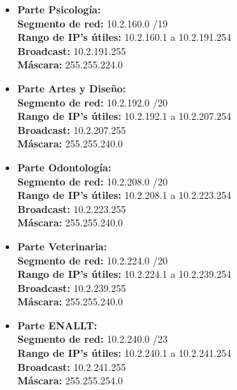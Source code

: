 \begin{itemize}[leftmargin=*]
    \item \textbf{Parte Psicología:} \\
    \textbf{Segmento de red:} 10.2.160.0 /19 \\
    \textbf{Rango de IP's útiles:} 10.2.160.1 a 10.2.191.254 \\
    \textbf{Broadcast:} 10.2.191.255 \\
    \textbf{Máscara:} 255.255.224.0 
    \vspace{5pt}

    \item \textbf{Parte Artes y Diseño:} \\
    \textbf{Segmento de red:} 10.2.192.0 /20 \\
    \textbf{Rango de IP's útiles:} 10.2.192.1 a 10.2.207.254 \\
    \textbf{Broadcast:} 10.2.207.255 \\
    \textbf{Máscara:} 255.255.240.0 
    \vspace{5pt}

    \item \textbf{Parte Odontología:} \\
    \textbf{Segmento de red:} 10.2.208.0 /20 \\
    \textbf{Rango de IP's útiles:} 10.2.208.1 a 10.2.223.254 \\
    \textbf{Broadcast:} 10.2.223.255 \\
    \textbf{Máscara:} 255.255.240.0 
    \vspace{5pt}

    \item \textbf{Parte Veterinaria:} \\
    \textbf{Segmento de red:} 10.2.224.0 /20 \\
    \textbf{Rango de IP's útiles:} 10.2.224.1 a 10.2.239.254 \\
    \textbf{Broadcast:} 10.2.239.255 \\
    \textbf{Máscara:} 255.255.240.0 
    \vspace{5pt}

    \item \textbf{Parte ENALLT:} \\
    \textbf{Segmento de red:} 10.2.240.0 /23 \\
    \textbf{Rango de IP's útiles:} 10.2.240.1 a 10.2.241.254 \\
    \textbf{Broadcast:} 10.2.241.255 \\
    \textbf{Máscara:} 255.255.254.0 
\end{itemize}